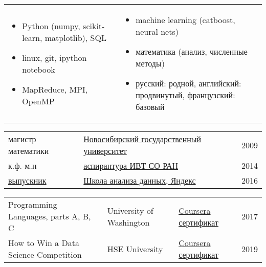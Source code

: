 \documentclass[11pt]{article}
\begin{document}
\begin{longtable} {p{}p{}}
\vspace{-2.0em}
\begin{itemize}
	\item Python (numpy, scikit-learn, matplotlib), SQL
	\item linux, git, ipython notebook
	\item MapReduce, MPI, OpenMP
\end{itemize}
&
\vspace{-2.0em}
\begin{itemize}
	\item machine learning (catboost, neural nets)
	\item математика (анализ, численные методы)
	\item русский: родной, английский: продвинутый, французский: базовый
\end{itemize}
\\
\end{longtable}

\vspace{-2.5em}

\begin{longtable} {p{}p{}l}
  магистр математики & \href{https://www.nsu.ru/}{Новосибирский государственный университет} & 2009 \vspace{0.5em} \\
	к.ф.-м.н & \href{http://www.ict.nsc.ru/ru/education/postgraduate}{аспирантура ИВТ СО РАН} & 2014 \vspace{0.5em}\\
  \href{https://academy.yandex.ru/dataschool/life}{выпускник} & \href{https://yandexdataschool.ru}{Школа анализа данных, Яндекс} & 2016 \vspace{0.5em}\\
\end{longtable}

\vspace{-1.0em}

\vspace{-0.5em}
\begin{longtable} {p{}p{}ll}
	Programming Languages, parts A, B, C &
	University of Washington & \href{https://coursera.org/share/3e187e640ed6df57b0a84ecb8a82ddab}{Coursera сертификат} & 2017 \vspace{0.5em}\\
	How to Win a Data Science Competition & HSE University & \href{https://coursera.org/share/0ad3f02a08a405800c29d5909caece90}{Coursera сертификат} & 2019   \vspace{0.5em}\\
\end{longtable}

\vspace{-1.0em}


\end{document}
